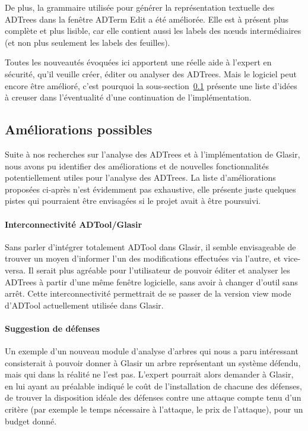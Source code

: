 De plus, la grammaire utilisée pour générer la représentation textuelle des ADTrees dans la fenêtre \og ADTerm Edit \fg{} a été améliorée. Elle est à présent plus complète et plus lisible, car elle contient aussi les labels des n\oe{}uds intermédiaires (et non plus seulement les labels des feuilles).

Toutes les nouveautés évoquées ici apportent une réelle aide à l'expert en sécurité, qu'il veuille créer, éditer ou analyser des ADTrees. Mais le logiciel peut encore être amélioré, c'est pourquoi la {\sc sous-section}~\ref{subsec:encorePlusMieux} présente une liste d'idées à creuser dans l'éventualité d'une continuation de l'implémentation.

\subsection{Améliorations possibles}
\label{subsec:encorePlusMieux}

Suite à nos recherches sur l'analyse des ADTrees et à l'implémentation de Glasir, nous avons pu identifier des améliorations et de nouvelles fonctionnalités potentiellement utiles pour l'analyse des ADTrees. La liste d'améliorations proposées ci-après n'est évidemment pas exhaustive, elle présente juste quelques pistes qui pourraient être envisagées si le projet avait à être poursuivi.

\paragraph{Interconnectivité ADTool/Glasir} Sans parler d'intégrer totalement ADTool dans Glasir, il semble envisageable de trouver un moyen d'informer l'un des modifications effectuées via l'autre, et vice-versa. Il serait plus agréable pour l'utilisateur de pouvoir éditer et analyser les ADTrees à partir d'une même fenêtre logicielle, sans avoir à changer d'outil sans arrêt. Cette interconnectivité permettrait de se passer de la version \og view mode \fg{} d'ADTool actuellement utilisée dans Glasir. 

\paragraph{Suggestion de défenses} Un exemple d'un nouveau module d'analyse d'arbres qui nous a paru intéressant consisterait à pouvoir donner à Glasir un arbre représentant un système défendu, mais qui dans la réalité ne l'est pas. L'expert pourrait alors demander à Glasir, en lui ayant au préalable indiqué le coût de l'installation de chacune des défenses, de trouver la disposition idéale des défenses contre une attaque compte tenu d'un critère (par exemple le temps nécessaire à l'attaque, le prix de l'attaque), pour un budget donné.

